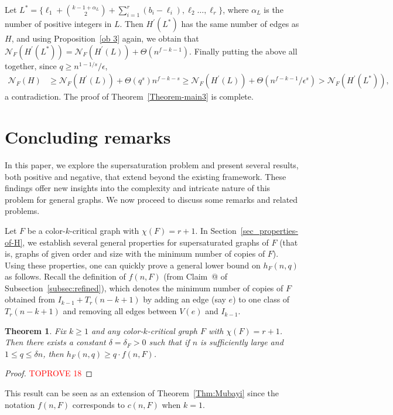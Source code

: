 \documentclass[10pt]{article}
\makeatletter
\newtheorem{theorem}{Theorem}[section]
\newcommand*{\rom}[1]{\expandafter\@slowromancap\romannumeral #1@}
\def\QED{{\hfill\enspace\vrule height8pt depth0pt width8pt}}
\makeatother
\begin{document}
Let $L^\ast=\{\ell_1+{k-1+\alpha_L \choose 2}+\sum_{i=1}^{r}(b_i-\ell_i),\ell_2\ldots,\ell_r\}$, where $\alpha_L$ is the number of positive integers in $L$.
Then $H^\prime(L^\ast)$ has the same number of edges as $H$, and using Proposition~\ref{ob 3} again,
we obtain that $\mathcal{N}_F(H^\prime(L^\ast))=\mathcal{N}_F(H^\prime(L))+\Theta(n^{f-k-1})$.
Finally putting the above all together, since $q\geq n^{1-1/s}/\epsilon$,
\begin{align*}
\mathcal{N}_F(H)&\geq \mathcal{N}_F(H^\prime(L))+\Theta(q^s)n^{f-k-s}\geq \mathcal{N}_F(H^\prime(L))+\Theta(n^{f-k-1}/\epsilon^s)>\mathcal{N}_F(H^\prime(L^\ast)),
\end{align*}
a contradiction. The proof of Theorem~\ref{Theorem-main3} is complete.
\QED


\section{Concluding remarks}
In this paper, we explore the supersaturation problem and present several results, both positive and negative, that extend beyond the existing framework. These findings offer new insights into the complexity and intricate nature of this problem for general graphs.
We now proceed to discuss some remarks and related problems.

Let $F$ be a color-$k$-critical graph with $\chi(F)=r+1$.
In Section~\ref{sec_properties-of-H}, we establish several general properties for supersaturated graphs of $F$ (that is, graphs of given order and size with the minimum number of copies of $F$). Using these properties, one can quickly prove a general lower bound on $h_F(n,q)$ as follows.
Recall the definition of $f(n,F)$ (from Claim~\rom{3} of Subsection~\ref{subsec:refined}), 
which denotes the minimum number of copies of $F$ obtained from $I_{k-1}+ T_r(n-k+1)$ by adding an edge (say $e$) to one class of $T_r(n-k+1)$ and removing all edges between $V(e)$ and $I_{k-1}$.

\begin{theorem}
Fix $k\geq 1$ and any color-$k$-critical graph $F$ with $\chi(F)=r+1$.
Then there exists a constant $\delta = \delta_F>0$ such that if $n$ is sufficiently large and $1\leq q\leq \delta n$, then
$h_F (n, q) \geq q\cdot f(n, F)$.
\end{theorem}
\begin{proof}\textcolor{red}{TOPROVE 18}\end{proof}

This result can be seen as an extension of Theorem~\ref{Thm:Mubayi} since the notation $f(n,F)$ corresponds to $c(n,F)$ when $k=1$.
\end{document}
